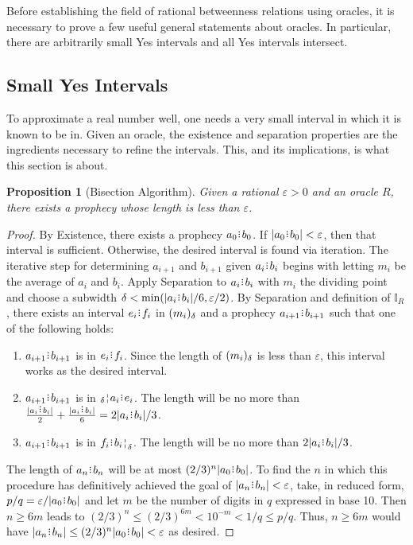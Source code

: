 \documentclass[12pt]{article}
\newtheorem{proposition}{Proposition}[section]
\begin{document}
Before establishing the field of rational betweenness relations using oracles, it is necessary to prove a few useful general statements about oracles. In particular, there are arbitrarily small Yes intervals and all Yes intervals intersect. 

\subsection{Small Yes Intervals}

To approximate a real number well, one needs a very small interval in which it is known to be in. Given an oracle, the existence and separation properties are the ingredients necessary to refine the intervals. This, and its implications, is what this section is about. 


\begin{proposition}[Bisection Algorithm]
    Given a rational $\varepsilon >0$ and an oracle $R$, there exists a prophecy whose length is less than $\varepsilon$.
\end{proposition}

\begin{proof}
    By Existence, there exists a prophecy $a_0\rint b_0$. If $|a_0\rint b_0| < \varepsilon$, then that interval is sufficient. Otherwise, the desired interval is found via iteration. The iterative step for determining $a_{i+1}$ and $b_{i+1}$ given $a_i\rint b_i$ begins with letting $m_i$ be the average of $a_i$ and $b_i$. Apply Separation to $a_i\rint b_i$ with $m_i$ the dividing point and choose a subwidth $\delta < \min(|a_i\rint b_i|/6, \varepsilon /2)$. By Separation and definition of $\mathbb{I}_R$, there exists an interval $e_i\rint f_i$ in $(m_i)_{\delta}$ and a prophecy $a_{i+1}\rint b_{i+1}$ such that one of the following holds:  
    \begin{enumerate}
        \item $a_{i+1}\rint b_{i+1}$ is in $e_i\rint f_i$. Since the length of $(m_i)_{\delta}$ is less than $\varepsilon$, this interval works as the desired interval.  
        \item  $a_{i+1}\rint b_{i+1}$ is in $\fuzbleft{a_i} \rint e_i$. The length will be no more than $\frac{|a_i\rint b_i|}{2}  + \frac{|a_i\rint b_i|}{6} = 2|a_i\rint b_i|/3$.
        \item  $a_{i+1}\rint b_{i+1}$ is in $f_i\rint \fuzbright{b_i}$. The length will be no more than $2|a_i\rint b_i|/3$.
    \end{enumerate}
    The length of $a_n\rint b_n$ will be at most $(2/3)^n |a_0\rint b_0|$. To find the $n$ in which this procedure has definitively achieved the goal of $|a_n\rint b_n|<\varepsilon$,  take, in reduced form, $p/q = \varepsilon/|a_0\rint b_0|$ and let $m$ be the number of digits in $q$ expressed in base 10. Then $n \geq  6m$ leads to  $(2/3)^n \leq (2/3)^{6m} < 10^{-m} < 1/q \leq p/q$. Thus, $n \geq 6m$ would have $|a_n\rint b_n| \leq (2/3)^n |a_0\rint b_0| < \varepsilon$ as desired. 
\end{proof}
\end{document}
